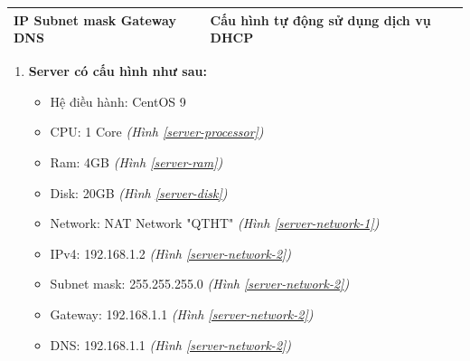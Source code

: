 \documentclass[a4paper, 11pt]{article}
\begin{document}
\begin{itemize}
\begin{multicols}{2}
\begin{minipage}{\linewidth}
\begin{tabular}{| p{.3\linewidth} | p{.4\linewidth} |}
                      \textbf{IP \newline Subnet mask \newline Gateway \newline DNS} & Cấu hình tự động sử dụng dịch vụ DHCP                                \\
                      \hline
                  \end{tabular}
              \end{minipage}
          \end{multicols}
          \begin{enumerate}
              \item \textbf{Server có cấu hình như sau:}
                    \begin{itemize}
                        \item Hệ điều hành: CentOS 9
                        \item CPU: 1 Core \textit{(Hình \ref{server-processor})}
                        \item Ram: 4GB \textit{(Hình \ref{server-ram})}
                        \item Disk: 20GB \textit{(Hình \ref{server-disk})}
                        \item Network: NAT Network "QTHT" \textit{(Hình \ref{server-network-1})}
                        \item IPv4: 192.168.1.2 \textit{(Hình \ref{server-network-2})}
                        \item Subnet mask: 255.255.255.0 \textit{(Hình \ref{server-network-2})}
                        \item Gateway: 192.168.1.1 \textit{(Hình \ref{server-network-2})}
                        \item DNS: 192.168.1.1 \textit{(Hình \ref{server-network-2})}
                    \end{itemize}


\end{enumerate}
\end{itemize}
\end{document}
